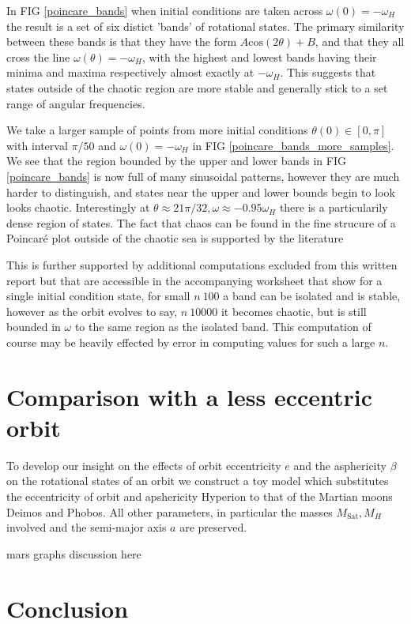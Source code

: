 \documentclass[10pt, twocolumn]{article} %
\begin{document}
In FIG \ref{poincare_bands} when initial conditions are taken across $\omega(0) = -\omega_H$ the result is a set of six distict 'bands' of rotational states. The primary similarity between these bands is that they have the form $A \mathrm{cos}(2\theta) + B$, and that they all cross the line $\omega(\theta)=-\omega_H$, with the highest and lowest bands having their minima and maxima respectively almost exactly at $-\omega_H$. This suggests that states outside of the chaotic region are more stable and generally stick to a set range of angular frequencies.

We take a larger sample of points from more initial conditions $\theta(0) \in [0, \pi]$ with interval $\pi/50$ and $\omega(0)=-\omega_H$ in FIG \ref{poincare_bands_more_samples}. We see that the region bounded by the upper and lower bands in FIG \ref{poincare_bands} is now full of many sinusoidal patterns, however they are much harder to distinguish, and states near the upper and lower bounds begin to look looks chaotic. Interestingly at $\theta \approx 21\pi/32, \omega \approx -0.95\omega_H$ there is a particularily dense region of states. The fact that chaos can be found in the fine strucure of a Poincar\'e plot outside of the chaotic sea is supported by the literature \cite{}

This is further supported by additional computations excluded from this written report but that are accessible in the accompanying worksheet that show for a single initial condition state, for small $n ~ 100$ a band can be isolated and is stable, however as the orbit evolves to say, $n ~ 10000$ it becomes chaotic, but is still bounded in $\omega$ to the same region as the isolated band. This computation of course may be heavily effected by error in computing values for such a large $n$.

\section*{Comparison with a less eccentric orbit}
To develop our insight on the effects of orbit eccentricity $e$ and the asphericity $\beta$ on the rotational states of an orbit we construct a toy model which substitutes the eccentricity of orbit and apshericity Hyperion to that of the Martian moons Deimos and Phobos. All other parameters, in particular the masses $M_\text{Sat}, M_H$ involved and the semi-major axis $a$ are preserved.

mars graphs discussion here

\section*{Conclusion}
\end{document}
